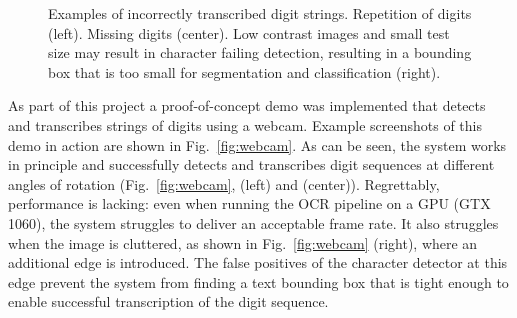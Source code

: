 \documentclass[11pt]{article}
\newcommand\figref[1]{Fig.~\ref{fig:#1}}
\begin{document}
\begin{figure}[ht!]
{    }
    \caption{
      Examples of incorrectly transcribed digit strings. Repetition of digits (left).
      Missing digits (center). Low contrast images and small test size may result in character failing detection,
      resulting in a bounding box that is too small for segmentation and classification (right).
    }
    \label{fig:bad_examples_pipeline}
\end{figure}

As part of this project a proof-of-concept demo was implemented that detects and transcribes
strings of digits using a webcam. Example screenshots of this demo in action are shown in \figref{webcam}. As can be seen,
the system works in principle and successfully detects and transcribes digit sequences at
different angles of rotation (\figref{webcam}, (left) and (center)).
Regrettably, performance is lacking: even when running the OCR pipeline on a GPU (GTX 1060), the system struggles to deliver an acceptable frame rate.
It also struggles when the image is cluttered, as shown in \figref{webcam} (right), where
an additional edge is introduced. The false positives of the character detector at this edge
prevent the system from finding a text bounding box that is tight enough to enable successful transcription
of the digit sequence.
\end{document}

